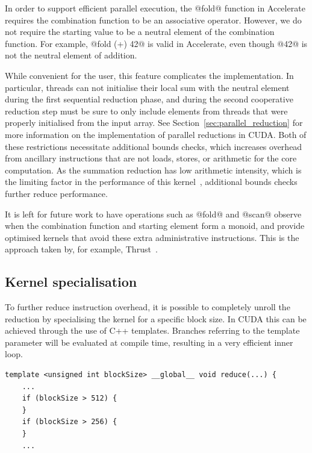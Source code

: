 In order to support efficient parallel execution, the @fold@ function in
Accelerate requires the combination function to be an associative operator.
However, we do not require the starting value to be a neutral element of the
combination function. For example, @fold (+) 42@ is valid in Accelerate, even
though @42@ is not the neutral element of addition.

While convenient for the user, this feature complicates the implementation. In
particular, threads can not initialise their local sum with the neutral element
during the first sequential reduction phase, and during the second cooperative
reduction step must be sure to only include elements from threads that were
properly initialised from the input array. See
Section~\ref{sec:parallel_reduction} for more information on the implementation
of parallel reductions in CUDA\@. Both of these restrictions necessitate
additional bounds checks, which increases overhead from ancillary instructions
that are not loads, stores, or arithmetic for the core computation. As the
summation reduction has low arithmetic intensity, which is the limiting factor
in the performance of this kernel~\cite{Harris:2007te}, additional bounds checks
further reduce performance.

It is left for future work to have operations such as @fold@ and @scan@ observe
when the combination function and starting element form a monoid, and provide
optimised kernels that avoid these extra administrative instructions. This is
the approach taken by, for example, Thrust~\cite{ThrustAParallelT:ub}.


\subsection{Kernel specialisation}

To further reduce instruction overhead, it is possible to completely unroll the
reduction by specialising the kernel for a specific block size. In CUDA this can
be achieved through the use of C++ templates. Branches referring to the template
parameter will be evaluated at compile time, resulting in a very efficient inner
loop.
%
\begin{lstlisting}[style=cuda]
template <unsigned int blockSize> __global__ void reduce(...) {
    ...
    if (blockSize > 512) {
    }
    if (blockSize > 256) {
    }
    ...
\end{lstlisting}


